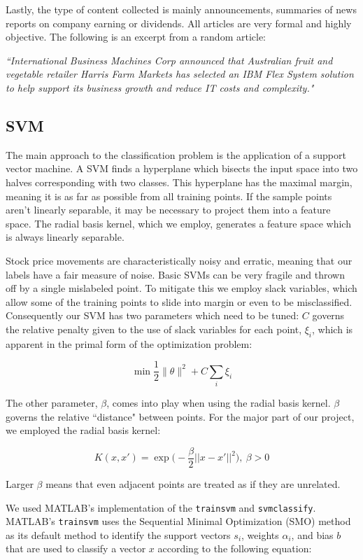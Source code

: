 \documentclass{article}
\begin{document}
Lastly, the type of content collected is mainly announcements, summaries of news reports on company earning or dividends. All articles are very formal and highly objective. The following is an excerpt from a random article: 

{\em``International Business Machines Corp announced that Australian fruit and vegetable retailer Harris Farm Markets has selected an IBM Flex System solution to help support its business growth and reduce IT costs and complexity."}


\subsection{SVM}

The main approach to the classification problem is the application of a support vector machine. A SVM finds a hyperplane which bisects the input space into two halves corresponding with two classes. This hyperplane has the maximal margin, meaning it is as far as possible from all training points. If the sample points aren't linearly separable, it may be necessary to project them into a feature space. The radial basis kernel, which we employ, generates a feature space which is always linearly separable. 

Stock price movements are characteristically noisy and erratic, meaning that our labels have a fair measure of noise. Basic SVMs can be very fragile and thrown off by a single mislabeled point. To mitigate this we employ slack variables, which allow some of the training points to slide into margin or even to be misclassified. Consequently our SVM has two parameters which need to be tuned: $C$ governs the relative penalty given to the use of slack variables for each point, $\xi_i$, which is apparent in the primal form of the optimization problem:

$$ \min \frac{1}{2}\|\theta\|^2 + C \sum_i \xi_i$$

The other parameter, $\beta$, comes into play when using the radial basis kernel. $\beta$ governs the relative ``distance" between points. For the major part of our project, we employed the radial basis kernel:

$$K(x, x') = \exp \big ( - \dfrac \beta 2 ||x-x'||^2 \big ), \ \beta > 0$$

Larger $\beta$ means that even adjacent points are treated as if they are unrelated. 

We used MATLAB's implementation of the \texttt{trainsvm} and \texttt{svmclassify}. MATLAB's \texttt{trainsvm} uses the Sequential Minimal Optimization (SMO) method as its default method to identify the support vectors $s_i$, weights $\alpha_i$, and bias $b$ that are used to classify a vector $x$ according to the following equation: 
\end{document}
